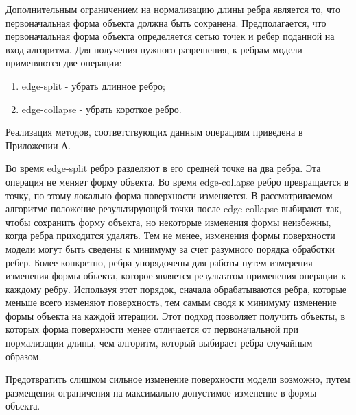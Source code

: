 \documentclass[14pt]{article}
\numberwithin{figure}{section}
\numberwithin{equation}{section}
\begin{document}
Дополнительным ограничением на нормализацию длины ребра является то, что первоначальная форма объекта должна быть сохранена. Предполагается, что первоначальная форма объекта определяется сетью точек и ребер поданной на вход алгоритма. Для получения нужного разрешения, к ребрам модели применяются две операции:

\begin{enumerate}
	\item
	edge-split - убрать длинное ребро;
	\item
	edge-collapse - убрать короткое ребро.
\end{enumerate}

Реализация методов, соответствующих данным операциям приведена в Приложении А.

Во время edge-split ребро разделяют в его средней точке на два ребра. Эта операция не меняет форму объекта. Во время edge-collapse ребро превращается в точку, по этому локально форма поверхности изменяется. В рассматриваемом алгоритме положение результирующей точки после edge-collapse выбирают так, чтобы сохранить форму объекта, но некоторые изменения формы неизбежны, когда ребра приходится удалять. Тем не менее, изменения формы поверхности модели могут быть сведены к минимуму за счет разумного порядка обработки ребер. Более конкретно, ребра упорядочены для работы путем измерения изменения формы объекта, которое является результатом применения операции к каждому ребру. Используя этот порядок, сначала обрабатываются ребра, которые меньше всего изменяют поверхность, тем самым сводя к минимуму изменение формы объекта на каждой итерации. Этот подход позволяет получить объекты, в которых форма поверхности менее отличается от первоначальной при нормализации длины, чем алгоритм, который выбирает ребра случайным образом.


Предотвратить слишком сильное изменение поверхности модели возможно, путем размещения ограничения на максимально допустимое изменение в формы объекта.
\end{document}

